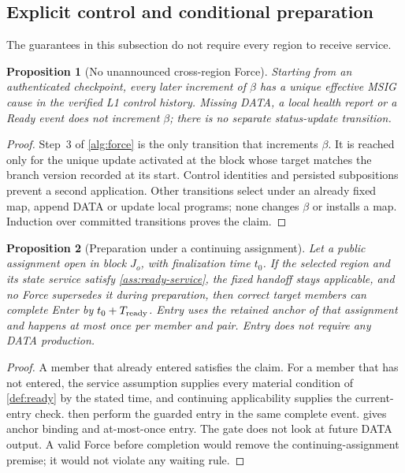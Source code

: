 \documentclass[11pt,a4paper]{article}
\newtheorem{proposition}[proposition]{Proposition}
\begin{document}
\subsection{Explicit control and conditional preparation}
\label{sec:liveness}
The guarantees in this subsection do not require every region to receive
service.

\begin{proposition}[No unannounced cross-region Force]
\label{prop:explicit-force}
Starting from an authenticated checkpoint, every later increment of
$\beta$ has a unique effective MSIG cause in the verified L1 control
history. Missing DATA, a local health report or a Ready event does not
increment $\beta$; there is no separate status-update transition.
\end{proposition}
\begin{proof}
Step~3 of \cref{alg:force} is the only transition that increments
$\beta$. It is reached only for the unique update activated at the block
whose target matches the branch version recorded at its start. Control identities
and persisted subpositions prevent a second application. Other
transitions select under an already fixed map, append DATA or update
local programs; none changes $\beta$ or installs a map. Induction over committed
transitions proves the claim.
\end{proof}

\begin{proposition}[Preparation under a continuing assignment]
\label{prop:ready-bound}
Let a public assignment open in block $J_o$, with finalization time
$t_0$. If the selected region and its state service satisfy
\cref{ass:ready-service}, the fixed handoff stays applicable, and no
Force supersedes it during preparation, then correct target members can
complete Enter by $t_0+T_{\rm ready}$. Entry uses the retained
anchor of that assignment and happens at most once per member and pair.
Entry does not require any DATA production.
\end{proposition}
\begin{proof}
A member that already entered satisfies the claim. For a member that has
not entered, the service assumption supplies every material condition of
\cref{def:ready} by the stated time, and continuing applicability
supplies the current-entry check.  then
perform the guarded entry in the same complete event.
 gives anchor binding and at-most-once
entry. The gate does not look at future DATA output. A valid Force before
completion would remove the continuing-assignment premise; it would not
violate any waiting rule.
\end{proof}
\end{document}
